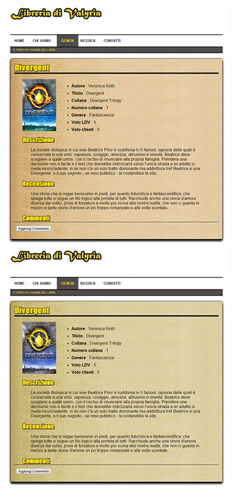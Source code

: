 \begin{figure}[H]
\begin{minipage}{0.45\textwidth}
\includegraphics[width=\linewidth]{images/vs_originale.jpg}
\end{minipage}
\hspace{\fill}
\begin{minipage}{0.45\textwidth}
\includegraphics[width=\linewidth]{images/screen/deuteranope.jpg}

\end{minipage}
\end{figure}
